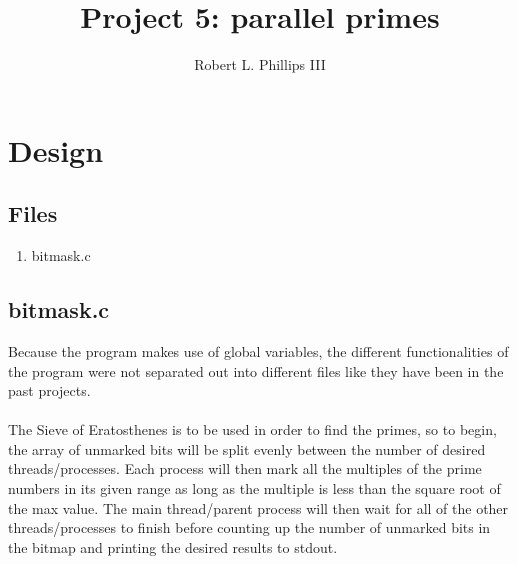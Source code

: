\documentclass{article}
\begin{document}
\title{Project 5:  parallel primes}
\author{Robert L. Phillips III}
\maketitle
\newpage
\tableofcontents
\newpage

\section{Design}
\subsection{Files}
\begin{enumerate}
\item bitmask.c
\end{enumerate}

\subsection{bitmask.c}

Because the program makes use of global variables, the different functionalities of the program were not separated out into different files like they have been in the past projects.\\\\

The Sieve of Eratosthenes is to be used in order to find the primes, so to begin, the array of unmarked bits will be split evenly between the number of desired threads/processes.  Each process will then mark all the multiples of the prime numbers in its given range as long as the multiple is less than the square root of the max value.  The main thread/parent process will then wait for all of the other threads/processes to finish before counting up the number of unmarked bits in the bitmap and printing the desired results to stdout.\\\\
\end{document}
